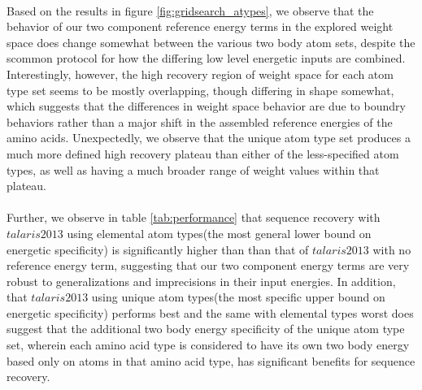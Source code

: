 \paragraph{}
Based on the results in figure \ref{fig:gridsearch_atypes}, we observe that the behavior of our two component reference energy terms in the explored weight space does change somewhat between the various two body atom sets, despite the scommon protocol for how the differing low level energetic inputs are combined.
Interestingly, however, the high recovery region of weight space for each atom type set seems to be mostly overlapping, though differing in shape somewhat, which suggests that the differences in weight space behavior are due to boundry behaviors rather than a major shift in the assembled reference energies of the amino acids.
Unexpectedly, we observe that the unique atom type set produces a much more defined high recovery plateau than either of the less-specified atom types, as well as having a much broader range of weight values within that plateau.

\paragraph{}
Further, we observe in table \ref{tab:performance} that sequence recovery with $talaris2013$ using elemental atom types(the most general lower bound on energetic specificity) is significantly higher than than that of $talaris2013$ with no reference energy term, suggesting that our two component energy terms are very robust to generalizations and imprecisions in their input energies.
In addition, that $talaris2013$ using unique atom types(the most specific upper bound on energetic specificity) performs best and the same with elemental types worst does suggest that the additional two body energy specificity of the unique atom type set, wherein each amino acid type is considered to have its own two body energy based only on atoms in that amino acid type, has significant benefits for sequence recovery.

